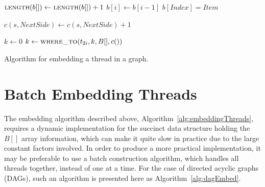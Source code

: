 \begin{algorithm}[H]
\begin{algorithmic}

  \State {}
  \State {}
  \State $\Call{length}{b[]} \gets \Call{length}{b[]} + 1$ 
  \ForAll{$i$ in $(Index, \Call{length}{b[]} - 1]$, descending}
  	\State $b[i] \gets b[i-1]$
  \EndFor
  \State $b[Index] = Item$
\EndProcedure

  \State {}
			\State $c(s, NextSide) \gets c(s, NextSide) + 1$
        \EndIf
  \EndFor
\EndProcedure

  \State {}
  \State {}
  \State $k \gets 0$ 
  \State {} \State {}
  \ForAll{$i$ in $[0, \Call{length}{t}/2)$}
      \State {}
      \State {} 
      \State {} 
      \State $k \gets \Call{where\_to}{t_{2i}, k, B[], c()}$
    \Else
      \State {} 
    \EndIf
  \EndFor
\EndProcedure
\end{algorithmic}
\caption[Algorithm for embedding a thread in a graph]{Algorithm for embedding a thread in a graph.}
\label{alg:embeddingThreads}
\end{algorithm}

\section{Batch Embedding Threads}

The embedding algorithm described above, Algorithm~\ref{alg:embeddingThreads}, requires a dynamic implementation for the succinct data structure holding the $B[]$ array information, which can make it quite slow in practice due to the large constant factors involved. In order to produce a more practical implementation, it may be preferable to use a batch construction algorithm, which handles all threads together, instead of one at a time. For the case of directed acyclic graphs (DAGs), such an algorithm is presented here as Algorithm~\ref{alg:dagEmbed}.

